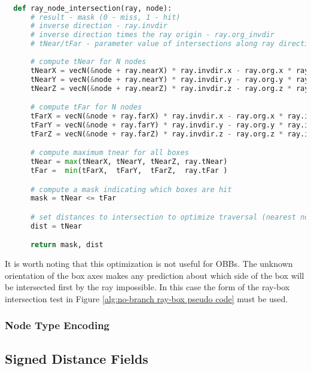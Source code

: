\begin{lstlisting}[language=Python,basicstyle=\tiny,caption={A non-branching
      ray-node intersection test for a quad tree implementation with precomputed
      near and far box coordinate values.},
    label={alg:no-branch ray-box optimized},captionpos=b]

  def ray_node_intersection(ray, node):
      # result - mask (0 - miss, 1 - hit)
      # inverse direction - ray.invdir
      # inverse direction times the ray origin - ray.org_invdir
      # tNear/tFar - parameter value of intersections along ray direction
  
      # compute tNear for N nodes
      tNearX = vecN(&node + ray.nearX) * ray.invdir.x - ray.org.x * ray.invdir.x
      tNearY = vecN(&node + ray.nearY) * ray.invdir.y - ray.org.y * ray.invdir.y
      tNearZ = vecN(&node + ray.nearZ) * ray.invdir.z - ray.org.z * ray.invdir.z

      # compute tFar for N nodes
      tFarX = vecN(&node + ray.farX) * ray.invdir.x - ray.org.x * ray.invdir.x
      tFarY = vecN(&node + ray.farY) * ray.invdir.y - ray.org.y * ray.invdir.y
      tFarZ = vecN(&node + ray.farZ) * ray.invdir.z - ray.org.z * ray.invdir.z

      # compute maximum tnear for all boxes
      tNear = max(tNearX, tNearY, tNearZ, ray.tNear) 
      tFar =  min(tFarX,  tFarY,  tFarZ,  ray.tFar )

      # compute a mask indicating which boxes are hit
      mask = tNear <= tFar

      # set distances to intersection to optimize traversal (nearest nodes first)
      dist = tNear

      return mask, dist
\end{lstlisting}

It is worth noting that this optimization is not useful for OBBs. The unknown
orientation of the box axes makes any prediction about which side of the box
will be intersected first by the ray impossible. In this case the form of the
ray-box intersection test in Figure \ref{alg:no-branch ray-box pseudo code} must
be used.

\subsubsection{Node Type Encoding}\label{sec:node_encoding}


\subsection{Signed Distance Fields}

